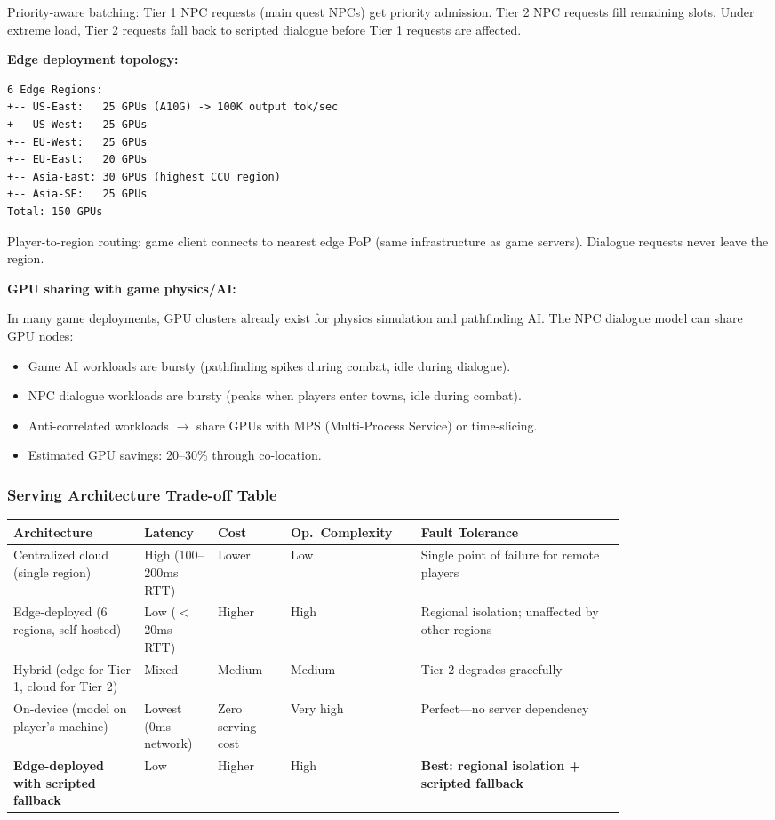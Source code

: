 \bigskip
Priority-aware batching: Tier 1 NPC requests (main quest NPCs) get priority admission. Tier 2 NPC requests fill remaining slots. Under extreme load, Tier 2 requests fall back to scripted dialogue before Tier 1 requests are affected.

\textbf{Edge deployment topology:}

\begin{verbatim}
6 Edge Regions:
+-- US-East:   25 GPUs (A10G) -> 100K output tok/sec
+-- US-West:   25 GPUs
+-- EU-West:   25 GPUs
+-- EU-East:   20 GPUs
+-- Asia-East: 30 GPUs (highest CCU region)
+-- Asia-SE:   25 GPUs
Total: 150 GPUs
\end{verbatim}

Player-to-region routing: game client connects to nearest edge PoP (same infrastructure as game servers). Dialogue requests never leave the region.

\textbf{GPU sharing with game physics/AI:}

In many game deployments, GPU clusters already exist for physics simulation and pathfinding AI. The NPC dialogue model can share GPU nodes:
\begin{itemize}
  \item Game AI workloads are bursty (pathfinding spikes during combat, idle during dialogue).
  \item NPC dialogue workloads are bursty (peaks when players enter towns, idle during combat).
  \item Anti-correlated workloads $\rightarrow$ share GPUs with MPS (Multi-Process Service) or time-slicing.
  \item Estimated GPU savings: 20--30\% through co-location.
\end{itemize}

\subsubsection*{Serving Architecture Trade-off Table}

{\small
\begin{tabular}{|p{0.18\linewidth}|p{0.1\linewidth}|p{0.1\linewidth}|p{0.14\linewidth}|p{0.28\linewidth}|}
\hline
\textbf{Architecture} & \textbf{Latency} & \textbf{Cost} & \textbf{Op.\ Complexity} & \textbf{Fault Tolerance} \\
\hline
Centralized cloud (single region) & High (100--200ms RTT) & Lower & Low & Single point of failure for remote players \\
\hline
Edge-deployed (6 regions, self-hosted) & Low ($<$ 20ms RTT) & Higher & High & Regional isolation; unaffected by other regions \\
\hline
Hybrid (edge for Tier 1, cloud for Tier 2) & Mixed & Medium & Medium & Tier 2 degrades gracefully \\
\hline
On-device (model on player's machine) & Lowest (0ms network) & Zero serving cost & Very high & Perfect---no server dependency \\
\hline
\textbf{Edge-deployed with scripted fallback} & Low & Higher & High & \textbf{Best: regional isolation + scripted fallback} \\
\hline
\end{tabular}
}

